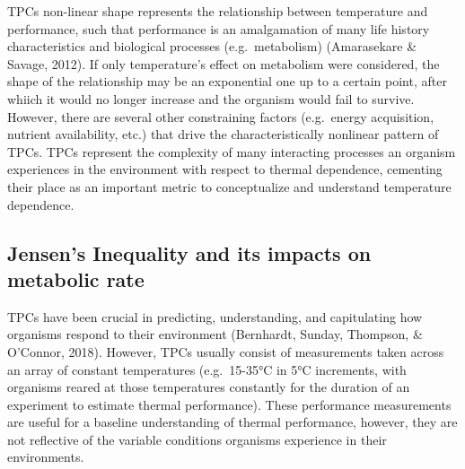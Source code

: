 \documentclass[12pt,twoside]{reedthesis}
\begin{document}
TPCs non-linear shape represents the relationship between temperature and performance, such that performance is an amalgamation of many life history characteristics and biological processes (e.g.~metabolism) (Amarasekare \& Savage, 2012). If only temperature's effect on metabolism were considered, the shape of the relationship may be an exponential one up to a certain point, after whiich it would no longer increase and the organism would fail to survive. However, there are several other constraining factors (e.g.~energy acquisition, nutrient availability, etc.) that drive the characteristically nonlinear pattern of TPCs. TPCs represent the complexity of many interacting processes an organism experiences in the environment with respect to thermal dependence, cementing their place as an important metric to conceptualize and understand temperature dependence.

\hypertarget{jensens-inequality-and-its-impacts-on-metabolic-rate}{%
\subsection{Jensen's Inequality and its impacts on metabolic rate}\label{jensens-inequality-and-its-impacts-on-metabolic-rate}}

TPCs have been crucial in predicting, understanding, and capitulating how organisms respond to their environment (Bernhardt, Sunday, Thompson, \& O'Connor, 2018). However, TPCs usually consist of measurements taken across an array of constant temperatures (e.g.~15-35°C in 5°C increments, with organisms reared at those temperatures constantly for the duration of an experiment to estimate thermal performance). These performance measurements are useful for a baseline understanding of thermal performance, however, they are not reflective of the variable conditions organisms experience in their environments.
\end{document}

